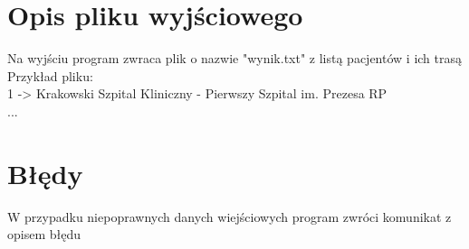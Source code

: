 \documentclass[]{article}
\begin{document}
\section{Opis pliku wyjściowego}
Na wyjściu program zwraca plik o nazwie "wynik.txt" z listą pacjentów i ich trasą\\
Przykład pliku:\\
1    ->  Krakowski Szpital Kliniczny - Pierwszy Szpital im. Prezesa RP\\
...\\


\section{Błędy}
W przypadku niepoprawnych danych wiejściowych program zwróci komunikat z opisem błędu
\end{document}
